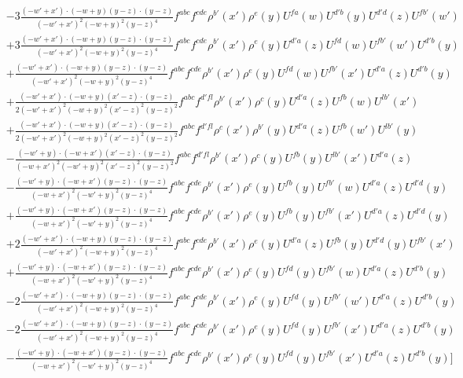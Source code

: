 \documentclass[aps,prd,amsmath,amssymb,nofootinbib]{revtex4-2}
\numberwithin{equation}{section}
\begin{document}
\begin{align}
    &- 3 \frac{( - w' + x') \cdot ( - w + y) (y - z) \cdot (y - z)}{( - w' + x')^{2} ( - w + y)^{2} (y - z)^{4}} f^{a b c} f^{c d e} \rho^{b'}(x') \rho^{e}(y) U^{fa}(w) U^{d'b}(y) U^{d'd}(z) U^{fb'}(w')\nonumber\\
    &+ 3 \frac{( - w' + x') \cdot ( - w + y) (y - z) \cdot (y - z)}{( - w' + x')^{2} ( - w + y)^{2} (y - z)^{4}} f^{a b c} f^{c d e} \rho^{b'}(x') \rho^{e}(y) U^{d'a}(z) U^{fd}(w) U^{f b'}(w') U^{d' b}(y)\nonumber\\
    &+  \frac{( - w' + x') \cdot ( - w + y) (y - z) \cdot (y - z)}{( - w' + x')^{2} ( - w + y)^{2} (y - z)^{4}} f^{a b c} f^{c d e} \rho^{b'}(x') \rho^{e}(y) U^{f d}(w) U^{f b'}(x') U^{d' a}(z) U^{d' b}(y)\nonumber\\
    &+ \frac{( - w' + x') \cdot ( - w + y) (x' - z) \cdot (y - z)}{2 ( - w' + x')^{2} ( - w + y)^{2} (x' - z)^{2} (y - z)^{2}} f^{a b c} f^{d' f l} \rho^{b'}(x') \rho^{c}(y) U^{d'a}(z) U^{f b}(w) U^{lb'}(x') \nonumber\\
      &+ \frac{( - w' + x') \cdot ( - w + y) (x' - z) \cdot (y - z)}{2 ( - w' + x')^{2} ( - w + y)^{2} (x' - z)^{2} (y - z)^{2}} f^{a b c} f^{d' f l} \rho^{c}(x') \rho^{b'}(y) U^{d'a}(z) U^{fb}(w') U^{lb'}(y) \nonumber\\
      &-  \frac{( - w' + y) \cdot ( - w + x') (x' - z) \cdot (y - z)}{( - w + x')^{2} ( - w' + y)^{2} (x' - z)^{2} (y - z)^{2}} f^{a b c} f^{d' f l} \rho^{b'}(x') \rho^{c}(y) U^{f b}(y) U^{lb'}(x') U^{d' a}(z) \nonumber\\
      &- \frac{( - w' + y) \cdot ( - w + x') (y - z) \cdot (y - z)}{( - w + x')^{2} ( - w' + y)^{2} (y - z)^{4}} f^{a b c} f^{c d e} \rho^{b'}(x') \rho^{e}(y) U^{f b}(y) U^{f b'}(w) U^{d' a}(z) U^{d' d}(y)\nonumber\\
      &+ \frac{( - w' + y) \cdot ( - w + x') (y - z) \cdot (y - z)}{( - w + x')^{2} ( - w' + y)^{2} (y - z)^{4}} f^{a b c} f^{c d e} \rho^{b'}(x') \rho^{e}(y) U^{f b}(y) U^{f b'}(x') U^{d' a}(z) U^{d' d}(y)\nonumber\\
       &+ 2 \frac{( - w' + x') \cdot ( - w + y) (y - z) \cdot (y - z)}{( - w' + x')^{2} ( - w + y)^{2} (y - z)^{4}} f^{a b c} f^{c d e} \rho^{b'}(x') \rho^{e}(y) U^{d'a}(z) U^{fb}(y) U^{d'd}(y) U^{fb'}(x')\nonumber\\
    &+ \frac{( - w' + y) \cdot ( - w + x') (y - z) \cdot (y - z)}{( - w + x')^{2} ( - w' + y)^{2} (y - z)^{4}} f^{a b c} f^{c d e} \rho^{b'}(x') \rho^{e}(y) U^{f d}(y) U^{f b'}(w) U^{d' a}(z) U^{d' b}(y)\nonumber\\
    &- 2 \frac{( - w' + x') \cdot ( - w + y) (y - z) \cdot (y - z)}{( - w' + x')^{2} ( - w + y)^{2} (y - z)^{4}} f^{a b c} f^{c d e} \rho^{b'}(x') \rho^{e}(y) U^{f d}(y) U^{f b'}(w') U^{d' a}(z) U^{d' b}(y)\nonumber\\
    &- 2 \frac{( - w' + x') \cdot ( - w + y) (y - z) \cdot (y - z)}{( - w' + x')^{2} ( - w + y)^{2} (y - z)^{4}} f^{a b c} f^{c d e} \rho^{b'}(x') \rho^{e}(y) U^{f d}(y) U^{f b'}(x') U^{d' a}(z) U^{d' b}(y)\nonumber\\
    &- \frac{( - w' + y) \cdot ( - w + x') (y - z) \cdot (y - z)}{( - w + x')^{2} ( - w' + y)^{2} (y - z)^{4}} f^{a b c} f^{c d e} \rho^{b'}(x') \rho^{e}(y) U^{f d}(y) U^{f b'}(x') U^{d' a}(z) U^{d' b}(y)\Bigg]
\end{align}
\end{document}
